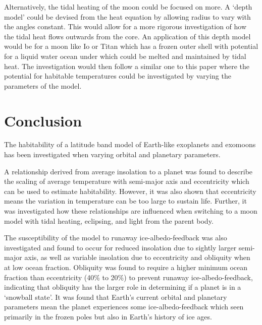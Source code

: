\documentclass[12pt, onecolumn]{revtex4-2}    %
\begin{document}
Alternatively, the tidal heating of the moon could be focused on more.
A `depth model' could be devised from the heat equation by allowing radius to vary with the angles constant.
This would allow for a more rigorous investigation of how the tidal heat flows outwards from the core.
An application of this depth model would be for a moon like Io or Titan which has a frozen outer shell with potential for a liquid water ocean under which could be melted and maintained by tidal heat.
The investigation would then follow a similar one to this paper where the potential for habitable temperatures could be investigated by varying the parameters of the model.

\section{Conclusion} \label{sec:Conclusion}
The habitability of a latitude band model of Earth-like exoplanets and exomoons has been investigated when varying orbital and planetary parameters.

A relationship derived from average insolation to a planet was found to describe the scaling of average temperature with semi-major axis and eccentricity which can be used to estimate habitability.
However, it was also shown that eccentricity means the variation in temperature can be too large to sustain life.
Further, it was investigated how these relationships are influenced when switching to a moon model with tidal heating, eclipsing, and light from the parent body.

The susceptibility of the model to runaway ice-albedo-feedback was also investigated and found to occur for reduced insolation due to sightly larger semi-major axis, as well as variable insolation due to eccentricity and obliquity when at low ocean fraction.
Obliquity was found to require a higher minimum ocean fraction than eccentricity (40\% to 20\%) to prevent runaway ice-albedo-feedback, indicating that obliquity has the larger role in determining if a planet is in a `snowball state'.
It was found that Earth's current orbital and planetary parameters mean the planet experiences some ice-albedo-feedback which seen primarily in the frozen poles but also in Earth's history of ice ages.
\end{document}

